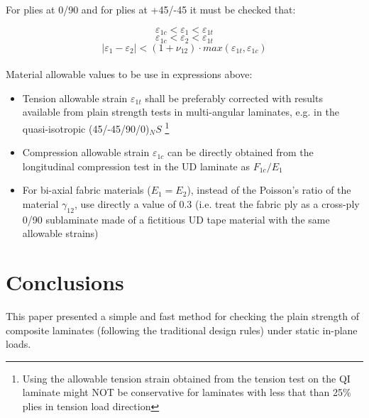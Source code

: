 \documentclass[a4paper,11pt]{article}
\begin{document}
For plies at 0\textdegree/90\textdegree{} and for plies at +45\textdegree/-45\textdegree{} it must be checked that:

	$$ 	\varepsilon_{1c} < \varepsilon_{1} < \varepsilon_{1t} 	$$
	$$ 	\varepsilon_{1c} < \varepsilon_{2} < \varepsilon_{1t} 	$$
	$$ 	|\varepsilon_{1} - \varepsilon_{2}| < (1+\nu_{12})  \cdot  max(\varepsilon_{1t}, \varepsilon_{1c}) 	$$
\\

Material allowable values to be use in expressions above:
\begin{itemize}
\item Tension allowable strain $\varepsilon_{1t}$ shall be preferably corrected with results available from plain strength tests in multi-angular
laminates, e.g. in the quasi-isotropic (45/-45/90/0)$_{N}S$ \footnote{Using the allowable tension strain obtained from the tension test on the QI laminate might NOT be conservative for laminates with less that than 25\% plies in tension load direction}
\item Compression allowable strain $\varepsilon_{1c}$ can be directly obtained from the longitudinal compression test in the UD laminate as $F_{1c}/E_{1}$ 
\item For bi-axial fabric materials ($E_{1} = E_{2}$), instead of the Poisson's ratio of the material $\gamma_{12}$, use directly a value of 0.3 (i.e. treat the
fabric ply as a cross-ply 0/90 sublaminate made of a fictitious UD tape material with the same allowable strains)
\\
\end{itemize}


\section{Conclusions}

This paper presented a simple and fast method for checking the plain strength of composite laminates (following the traditional design rules) under static in-plane loads.
\\
\end{document}
